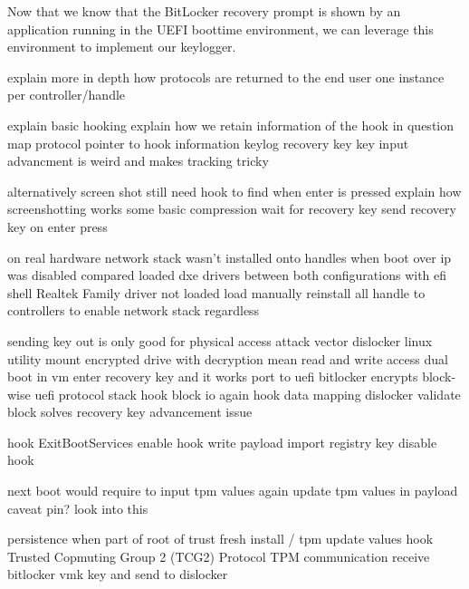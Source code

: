 Now that we know that the BitLocker recovery prompt is shown by an application running in the UEFI boottime environment, we can leverage this environment to implement our keylogger.

explain more in depth how protocols are returned to the end user
one instance per controller/handle

explain basic hooking
explain how we retain information of the hook in question
map protocol pointer to hook information
keylog recovery key
key input advancment is weird and makes tracking tricky

alternatively screen shot
still need hook to find when enter is pressed
explain how screenshotting works
some basic compression
wait for recovery key
send recovery key on enter press

on real hardware
network stack wasn't installed onto handles when boot over ip was disabled
compared loaded dxe drivers between both configurations with efi shell
Realtek Family driver not loaded
load manually
reinstall all handle to controllers to enable network stack regardless

sending key out is only good for physical access attack vector
dislocker linux utility
\cite{dislocker}
mount encrypted drive with decryption mean
read and write access
dual boot in vm
enter recovery key and it works
port to uefi
bitlocker encrypts block-wise
uefi protocol stack
hook block io
again hook data mapping
dislocker validate block
solves recovery key advancement issue

hook ExitBootServices
enable hook
write payload
import registry key
disable hook

next boot would require to input tpm values again
update tpm values in payload
caveat pin? look into this

persistence when part of root of trust
fresh install / tpm update values
hook Trusted Copmuting Group 2 (TCG2) Protocol
TPM communication
\cite[6.7.3]{tcg-efi-platform-spec}
receive bitlocker vmk key and send to dislocker

